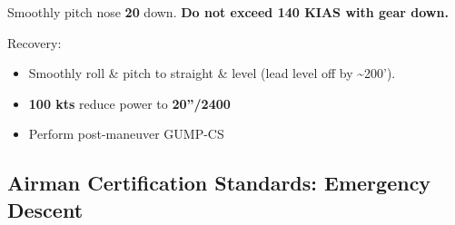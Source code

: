 {Smoothly pitch nose \textbf{20\degree{}} down. \textbf{Do not exceed 140 KIAS with gear down.}

Recovery:
\begin{itemize}[label={}]
\item Smoothly roll \& pitch to straight \& level (lead level off by \~{}200’).
\item \textbf{100 kts} reduce power to \textbf{20''/2400}
\item Perform post-maneuver GUMP-CS
\end{itemize}

\newpage
\subsection{Airman Certification Standards: Emergency Descent}

}
